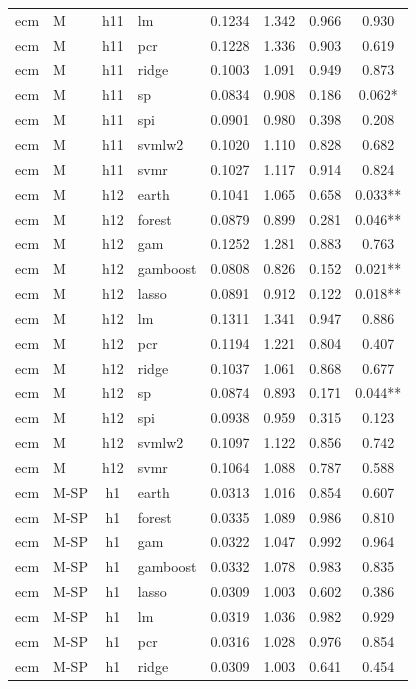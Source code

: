 \begin{ThreePartTable}
\begin{longtable}[t]{llclcccc}
ecm & M & h11 & lm & 0.1234 & 1.342 & 0.966 & 0.930\\
ecm & M & h11 & pcr & 0.1228 & 1.336 & 0.903 & 0.619\\
ecm & M & h11 & ridge & 0.1003 & 1.091 & 0.949 & 0.873\\
ecm & M & h11 & sp & 0.0834 & 0.908 & 0.186 & 0.062*\\
ecm & M & h11 & spi & 0.0901 & 0.980 & 0.398 & 0.208\\
ecm & M & h11 & svmlw2 & 0.1020 & 1.110 & 0.828 & 0.682\\
ecm & M & h11 & svmr & 0.1027 & 1.117 & 0.914 & 0.824\\
\addlinespace
ecm & M & h12 & earth & 0.1041 & 1.065 & 0.658 & 0.033**\\
ecm & M & h12 & forest & 0.0879 & 0.899 & 0.281 & 0.046**\\
ecm & M & h12 & gam & 0.1252 & 1.281 & 0.883 & 0.763\\
ecm & M & h12 & gamboost & 0.0808 & 0.826 & 0.152 & 0.021**\\
ecm & M & h12 & lasso & 0.0891 & 0.912 & 0.122 & 0.018**\\
ecm & M & h12 & lm & 0.1311 & 1.341 & 0.947 & 0.886\\
ecm & M & h12 & pcr & 0.1194 & 1.221 & 0.804 & 0.407\\
ecm & M & h12 & ridge & 0.1037 & 1.061 & 0.868 & 0.677\\
ecm & M & h12 & sp & 0.0874 & 0.893 & 0.171 & 0.044**\\
ecm & M & h12 & spi & 0.0938 & 0.959 & 0.315 & 0.123\\
ecm & M & h12 & svmlw2 & 0.1097 & 1.122 & 0.856 & 0.742\\
ecm & M & h12 & svmr & 0.1064 & 1.088 & 0.787 & 0.588\\
\addlinespace
ecm & M-SP & h1 & earth & 0.0313 & 1.016 & 0.854 & 0.607\\
ecm & M-SP & h1 & forest & 0.0335 & 1.089 & 0.986 & 0.810\\
ecm & M-SP & h1 & gam & 0.0322 & 1.047 & 0.992 & 0.964\\
ecm & M-SP & h1 & gamboost & 0.0332 & 1.078 & 0.983 & 0.835\\
ecm & M-SP & h1 & lasso & 0.0309 & 1.003 & 0.602 & 0.386\\
ecm & M-SP & h1 & lm & 0.0319 & 1.036 & 0.982 & 0.929\\
ecm & M-SP & h1 & pcr & 0.0316 & 1.028 & 0.976 & 0.854\\
ecm & M-SP & h1 & ridge & 0.0309 & 1.003 & 0.641 & 0.454\\

\end{longtable}
\end{ThreePartTable}
